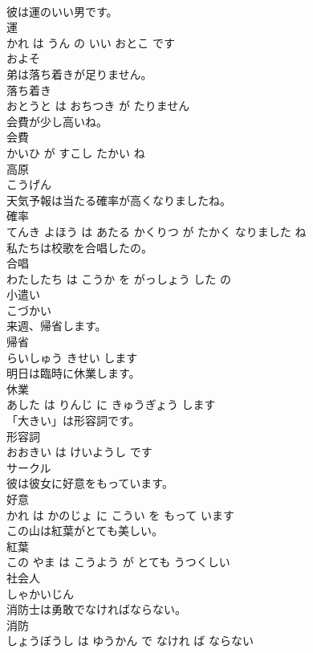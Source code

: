\documentclass[8pt]{extreport}
\begin{document}
\begin{CJK}{UTF8}{min}
\\	彼は運のいい男です。	
\\	運 
\\	かれ は うん の いい おとこ です			
\\	およそ	
\\	弟は落ち着きが足りません。	
\\	落ち着き 
\\	おとうと は おちつき が たりません			
\\	会費が少し高いね。	
\\	会費 
\\	かいひ が すこし たかい ね			
\\	高原	
\\	こうげん			
\\	天気予報は当たる確率が高くなりましたね。	
\\	確率 
\\	てんき よほう は あたる かくりつ が たかく なりました ね			
\\	私たちは校歌を合唱したの。	
\\	合唱 
\\	わたしたち は こうか を がっしょう した の			
\\	小遣い	
\\	こづかい			
\\	来週、帰省します。	
\\	帰省 
\\	らいしゅう きせい します			
\\	明日は臨時に休業します。	
\\	休業 
\\	あした は りんじ に きゅうぎょう します			
\\	「大きい」は形容詞です。	
\\	形容詞 
\\	おおきい は けいようし です			
\\	サークル	
\\	彼は彼女に好意をもっています。	
\\	好意 
\\	かれ は かのじょ に こうい を もって います			
\\	この山は紅葉がとても美しい。	
\\	紅葉 
\\	この やま は こうよう が とても うつくしい			
\\	社会人	
\\	しゃかいじん			
\\	消防士は勇敢でなければならない。	
\\	消防 
\\	しょうぼうし は ゆうかん で なけれ ば ならない			

\end{CJK}
\end{document}
